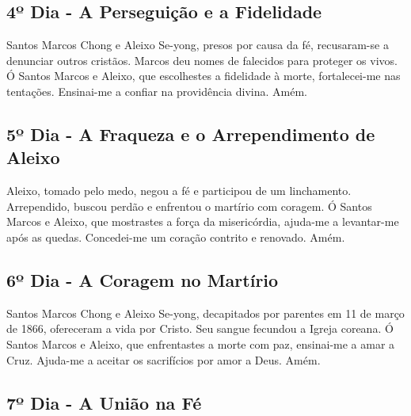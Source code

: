 \documentclass[a4paper,14pt]{extarticle} \usepackage[utf8]{inputenc}
\begin{document}
\underline{}

\subsection{4º Dia - A Perseguição e a Fidelidade}

\underline{}

Santos Marcos Chong e Aleixo Se-yong, presos por causa da fé, recusaram-se a denunciar outros cristãos. Marcos deu nomes de falecidos para proteger os vivos.
Ó Santos Marcos e Aleixo, que escolhestes a fidelidade à morte, fortalecei-me nas tentações. Ensinai-me a confiar na providência divina. Amém.

\underline{}

\subsection{5º Dia - A Fraqueza e o Arrependimento de Aleixo}

\underline{}

Aleixo, tomado pelo medo, negou a fé e participou de um linchamento. Arrependido, buscou perdão e enfrentou o martírio com coragem.
Ó Santos Marcos e Aleixo, que mostrastes a força da misericórdia, ajuda-me a levantar-me após as quedas. Concedei-me um coração contrito e renovado. Amém.

\underline{}

\subsection{6º Dia - A Coragem no Martírio}

\underline{}

Santos Marcos Chong e Aleixo Se-yong, decapitados por parentes em 11 de março de 1866, ofereceram a vida por Cristo. Seu sangue fecundou a Igreja coreana.
Ó Santos Marcos e Aleixo, que enfrentastes a morte com paz, ensinai-me a amar a Cruz. Ajuda-me a aceitar os sacrifícios por amor a Deus. Amém.


\underline{}


\subsection{7º Dia - A União na Fé}

\underline{}
\end{document}
